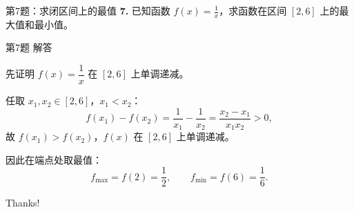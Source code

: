 \documentclass[10pt,aspectratio=169,serif]{beamer}
\begin{document}
\begin{frame}[t]{第7题：求闭区间上的最值}
\textbf{7.} 已知函数 $\displaystyle f(x)=\frac{1}{x}$，求函数在区间 $[2,6]$ 上的最大值和最小值。
\end{frame}

\begin{frame}[t]{第7题 解答}
\begin{tcolorbox}[colback=orange!10,colframe=orange,title=\textbf{解}]
先证明 $f(x)=\dfrac{1}{x}$ 在 $[2,6]$ 上单调递减。

任取 $x_1,x_2\in[2,6]$，$x_1<x_2$：
\[
f(x_1)-f(x_2)=\frac{1}{x_1}-\frac{1}{x_2}=\frac{x_2-x_1}{x_1x_2}>0,
\]
故 $f(x_1)>f(x_2)$，$f(x)$ 在 $[2,6]$ 上单调递减。

\vspace{0.3em}
因此在端点处取最值：
\[
f_{\max}=f(2)=\frac{1}{2},\qquad f_{\min}=f(6)=\frac{1}{6}.
\]
\end{tcolorbox}
\end{frame}

\begin{frame}[c]
  \begin{center}
    {\Huge\calligra Thanks!}
  \end{center}
\end{frame}
\end{document}
